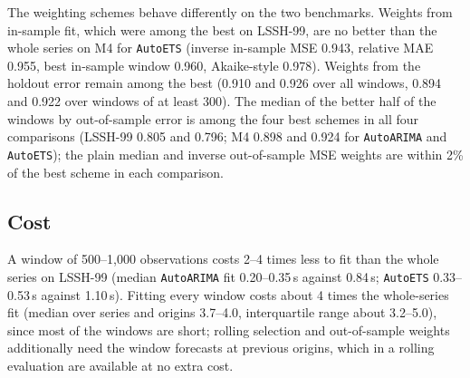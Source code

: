 \documentclass[11pt]{article}
\begin{document}
The weighting schemes behave differently on the two benchmarks. Weights from
in-sample fit, which were among the best on LSSH-99, are no better than the
whole series on M4 for \texttt{AutoETS} (inverse in-sample MSE 0.943, relative
MAE 0.955, best in-sample window 0.960, Akaike-style 0.978). Weights from the
holdout error remain among the best (0.910 and 0.926 over all windows, 0.894 and
0.922 over windows of at least 300). The median of the better half of the
windows by out-of-sample error is among the four best schemes in all four
comparisons (LSSH-99 0.805 and 0.796; M4 0.898 and 0.924 for \texttt{AutoARIMA}
and \texttt{AutoETS}); the plain median and inverse out-of-sample MSE weights
are within 2\% of the best scheme in each comparison.

\begin{table}[t]
\centering\small
\caption{M4 series with at least 500 training observations: OWA relative to
Naive2 by frequency. Holdout selection uses windows of at least 300
observations; the combinations use all windows.}
\label{tab:m4-main}
\resizebox{\textwidth}{!}{}
\end{table}

\begin{table}[t]
\centering\small
\caption{M4 long series: OWA of each combination scheme (all frequencies),
with the number of series with lower / higher MASE than the whole series.
$^*$: per-series MASE significantly different from the whole series in either
direction (Wilcoxon signed-rank, Bonferroni over 14 schemes). Bold: best per
forecaster.}
\label{tab:m4-schemes}
\resizebox{\textwidth}{!}{}
\end{table}

\subsection{Cost}
A window of 500--1{,}000 observations costs 2--4 times less to fit than the whole
series on LSSH-99 (median \texttt{AutoARIMA} fit 0.20--0.35\,s against 0.84\,s;
\texttt{AutoETS} 0.33--0.53\,s against 1.10\,s). Fitting every window costs
about 4 times the whole-series fit (median over series and origins 3.7--4.0,
interquartile range about 3.2--5.0), since most of the windows are short;
rolling selection
and out-of-sample weights additionally need the window forecasts at previous
origins, which in a rolling evaluation are available at no extra cost.

\end{document}
